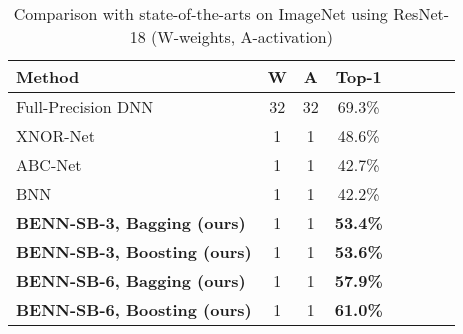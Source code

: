 \documentclass[10pt,twocolumn,letterpaper]{article}
\begin{document}
\begin{table}
    \vspace{-3mm}
        \caption{Comparison with state-of-the-arts on ImageNet using ResNet-18 (W-weights, A-activation)}
        \centering
        \scriptsize
        \begin{tabular}{lccccccr}
            \toprule
            \toprule
            Method & W & A & Top-1\\
            \midrule
            \multirow{1}{3.5cm}{Full-Precision DNN \cite{he2016deep, lin2017towards}} & 32 & 32 &  69.3\% \\
            \hline
            \multirow{1}{3.5cm}{XNOR-Net \cite{rastegari2016xnor}}  & 1 & 1 & 48.6\%\\
            \hline
            \multirow{1}{3.5cm}{ABC-Net \cite{lin2017towards}}  & 1 & 1 & 42.7\%\\
            \hline
            \multirow{1}{3.5cm}{BNN \cite{hubara2016binarized, rastegari2016xnor}} & 1 & 1 & 42.2\% \\
            \hline
            \multirow{1}{3.5cm}{\textbf{BENN-SB-3, Bagging (ours)}} & 1 & 1 & \textbf{53.4\%} \\
            \hline
            \multirow{1}{3.5cm}{\textbf{BENN-SB-3, Boosting (ours)}} & 1 & 1 & \textbf{53.6\%} \\
            \hline
            \multirow{1}{3.5cm}{\textbf{BENN-SB-6, Bagging (ours)}} & 1 & 1 & \textbf{57.9\%} \\
            \hline
            \multirow{1}{3.5cm}{\textbf{BENN-SB-6, Boosting (ours)}} & 1 & 1 & \textbf{61.0\%} \\
            \hline
            \bottomrule
        \end{tabular}
        \label{table:resnet}
        \vspace{-5mm}
\end{table}
\end{document}
